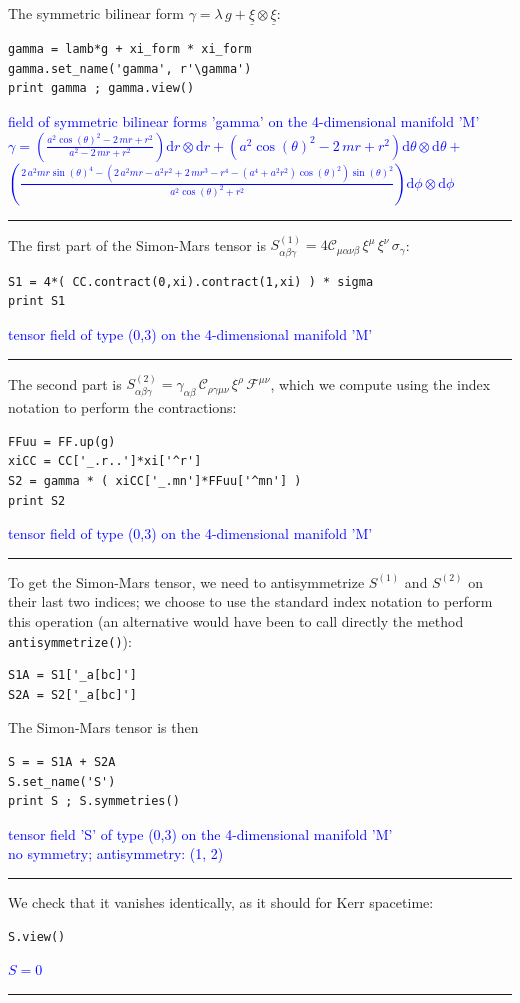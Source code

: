 \documentclass[a4paper]{jpconf}
\newcommand{\code}[1]{\texttt{#1}}
\newcommand{\soutput}[1]{\textcolor{blue}{#1}\\[-0.8ex]\rule{\textwidth}{0.4pt}}
\begin{document}
The symmetric bilinear form $\gamma = \lambda \, g + \underline{\xi}\otimes\underline{\xi}$:
\begin{verbatim}
gamma = lamb*g + xi_form * xi_form
gamma.set_name('gamma', r'\gamma')
print gamma ; gamma.view()
\end{verbatim}
\soutput{field of symmetric bilinear forms 'gamma' on the 4-dimensional manifold
'M'\\
$\gamma = \left( \frac{a^{2} \cos\left(\theta\right)^{2} - 2 \, m r +
r^{2}}{a^{2} - 2 \, m r + r^{2}} \right) \mathrm{d} r\otimes \mathrm{d}
r + \left( a^{2} \cos\left(\theta\right)^{2} - 2 \, m r + r^{2} \right)
\mathrm{d} \theta\otimes \mathrm{d} \theta +$\\
$\left( \frac{2 \, a^{2} m r
\sin\left(\theta\right)^{4} - {\left(2 \, a^{2} m r - a^{2} r^{2} + 2 \,
m r^{3} - r^{4} - {\left(a^{4} + a^{2} r^{2}\right)}
\cos\left(\theta\right)^{2}\right)} \sin\left(\theta\right)^{2}}{a^{2}
\cos\left(\theta\right)^{2} + r^{2}} \right) \mathrm{d} \phi\otimes
\mathrm{d} \phi$}
The first part of the Simon-Mars tensor is 
$S^{(1)}_{\alpha\beta\gamma} = 4 \mathcal{C}_{\mu\alpha\nu\beta} \, \xi^\mu \, \xi^\nu \, \sigma_\gamma$:
\begin{verbatim}
S1 = 4*( CC.contract(0,xi).contract(1,xi) ) * sigma
print S1
\end{verbatim}
\soutput{tensor field of type (0,3) on the 4-dimensional manifold 'M'}
The second part is 
$S^{(2)}_{\alpha\beta\gamma} = \gamma_{\alpha\beta} \, \mathcal{C}_{\rho\gamma\mu\nu} \, \xi^\rho \, \mathcal{F}^{\mu\nu}$, which we 
compute using the index notation to perform the contractions:
\begin{verbatim}
FFuu = FF.up(g)
xiCC = CC['_.r..']*xi['^r']
S2 = gamma * ( xiCC['_.mn']*FFuu['^mn'] )
print S2
\end{verbatim}
\soutput{tensor field of type (0,3) on the 4-dimensional manifold 'M'}
To get the Simon-Mars tensor, we need to antisymmetrize $S^{(1)}$ and
$S^{(2)}$ on their last two indices; we choose to use the standard
index notation to perform this operation (an alternative would have been
to call directly the method \code{antisymmetrize()}):
\begin{verbatim}
S1A = S1['_a[bc]']
S2A = S2['_a[bc]']
\end{verbatim}
The Simon-Mars tensor is then 
\begin{verbatim}
S = = S1A + S2A
S.set_name('S')
print S ; S.symmetries()
\end{verbatim}
\soutput{tensor field 'S' of type (0,3) on the 4-dimensional manifold 'M'\\
no symmetry;  antisymmetry: (1, 2)}
We check that it vanishes identically, as it should for Kerr spacetime:
\begin{verbatim}
S.view()
\end{verbatim}
\soutput{$S=0$}
\begin{verbatim}
\end{verbatim}
\begin{verbatim}
\end{verbatim}
\end{document}
